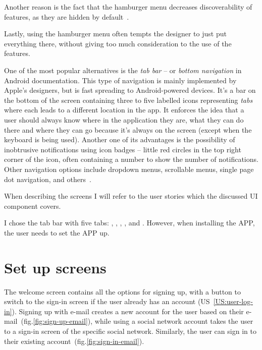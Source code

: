 Another reason is the fact that the hamburger menu decreases discoverability of features, as they are hidden by default~\cite{hamburger-discoverabillity}.

Lastly, using the hamburger menu often tempts the designer to just put everything there, without giving too much consideration to the use of the features.

One of the most popular alternatives is the \textit{tab bar} -- or \textit{bottom navigation} in Android documentation.
This type of navigation is mainly implemented by Apple's designers, but is fast spreading to Android-powered devices.
It's a bar on the bottom of the screen containing three to five labelled icons representing \textit{tabs} where each leads to a different location in the app.
It enforces the idea that a user should always know where in the application they are, what they can do there and where they can go because it's always on the screen (except when the keyboard is being used).
Another one of its advantages is the possibility of inobtrusive notifications using icon badges -- little red circles in the top right corner of the icon, often containing a number to show the number of notifications.
Other navigation options include dropdown menus, scrollable menus, single page dot navigation, and others~\cite{hamburger-alternatives}.

When describing the screens I will refer to the user stories which the discussed UI component covers.

I chose the tab bar with five tabs: , , , , and .
However, when installing the APP, the user needs to set the APP up.

\section{Set up screens}
The welcome screen contains all the options for signing up, with a button to switch to the sign-in screen if the user already has an account (US~\ref{US:user-log-in}).
Signing up with e-mail creates a new account for the user based on their e-mail~(fig.\ref{fig:sign-up-email}), while using a social network account takes the user to a sign-in screen of the specific social network.
Similarly, the user can sign in to their existing account~(fig.\ref{fig:sign-in-email}).


